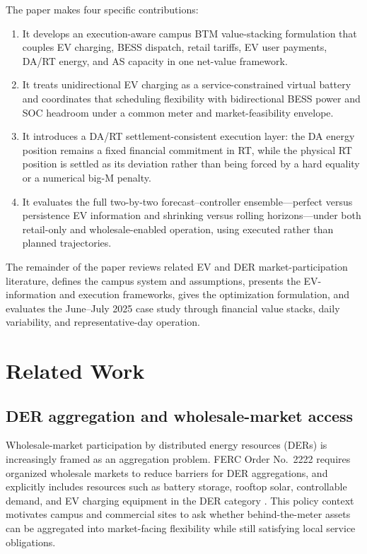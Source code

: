 \documentclass[final,5p,times]{elsarticle}
\begin{document}
The paper makes four specific contributions:
\begin{enumerate}[leftmargin=*]
    \item It develops an execution-aware campus BTM value-stacking formulation that couples EV charging, BESS dispatch, retail tariffs, EV user payments, DA/RT energy, and AS capacity in one net-value framework.
    \item It treats unidirectional EV charging as a service-constrained virtual battery and coordinates that scheduling flexibility with bidirectional BESS power and SOC headroom under a common meter and market-feasibility envelope.
    \item It introduces a DA/RT settlement-consistent execution layer: the DA energy position remains a fixed financial commitment in RT, while the physical RT position is settled as its deviation rather than being forced by a hard equality or a numerical big-M penalty.
    \item It evaluates the full two-by-two forecast--controller ensemble---perfect versus persistence EV information and shrinking versus rolling horizons---under both retail-only and wholesale-enabled operation, using executed rather than planned trajectories.
\end{enumerate}

The remainder of the paper reviews related EV and DER market-participation literature, defines the campus system and assumptions, presents the EV-information and execution frameworks, gives the optimization formulation, and evaluates the June--July 2025 case study through financial value stacks, daily variability, and representative-day operation.

\section{Related Work}
\label{sec:related_work}

\subsection{DER aggregation and wholesale-market access}
Wholesale-market participation by distributed energy resources (DERs) is increasingly framed as an aggregation problem. FERC Order No.~2222 requires organized wholesale markets to reduce barriers for DER aggregations, and explicitly includes resources such as battery storage, rooftop solar, controllable demand, and EV charging equipment in the DER category \cite{ferc2222}. This policy context motivates campus and commercial sites to ask whether behind-the-meter assets can be aggregated into market-facing flexibility while still satisfying local service obligations.
\end{document}
